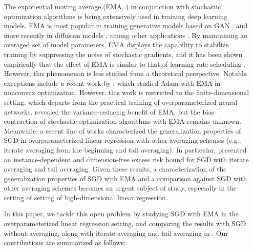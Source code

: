 \documentclass[11pt]{article}
\begin{document}
The exponential moving average (EMA, \citealt{polyak1992acceleration, ruppert1988efficient}) in conjunction with stochastic optimization algorithms is being extensively used in training deep learning models.
EMA is most popular in training generative models based on GAN \citep{yaz2018unusual, karras2019style, kang2023scaling}, and more recently in diffusion models \citep{song2020score, dhariwal2021diffusion, nichol2021improved, song2020denoising, balaji2022ediffi, karras2022elucidating, rombach2022high, karras2024analyzing}, among other applications \citep{block2023butterfly, busbridge2024scale}.
By maintaining an averaged set of model parameters, EMA displays the capability to stabilize training by suppressing the noise of stochastic gradients, and it has been shown empirically that the effect of EMA is similar to that of learning rate scheduling \citep{sandler2023training}.
However, this phenomenon is less studied from a theoretical perspective.
Notable exceptions include a recent work by \citet{ahn2024adam}, which studied Adam with EMA in nonconvex optimization. However, this work is restricted to the finite-dimensional setting, which departs from the practical training of overparameterized neural networks.
\citet{block2023butterfly} revealed the variance-reducing benefit of EMA, but the bias contraction of stochastic optimization algorithms with EMA remains unknown.
Meanwhile, a recent line of works \citep{defossez2015averaged, dieulevuet2017harder, jain2018parallelizing, berthier2020tight, zou2021benign, wu2022last} characterized the generalization properties of SGD in overparameterized linear regression with other averaging schemes (e.g., iterate averaging from the beginning and tail averaging).
In particular, \citet{zou2021benign} presented an instance-dependent and dimension-free excess risk bound for SGD with iterate averaging and tail averaging.
Given these results, a characterization of the generalization properties of SGD with EMA and a comparison against SGD with other averaging schemes becomes an urgent subject of study, especially in the setting of setting of high-dimensional linear regression.

In this paper, we tackle this open problem by studying SGD with EMA in the overparameterized linear regression setting, and comparing the results with SGD without averaging, along with iterate averaging and tail averaging in \citet{zou2021benign}.
Our contributions are summarized as follows:
\end{document}

